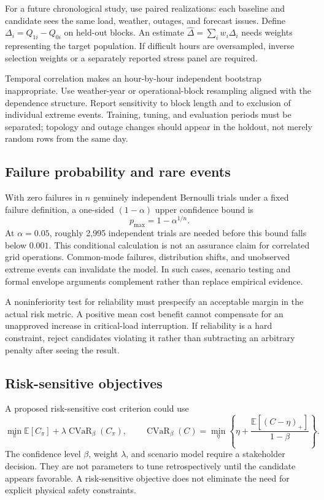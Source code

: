 \documentclass[11pt,letterpaper]{article}
\newcommand{\E}{\mathbb E}\newcommand{\R}{\mathbb R}\newcommand{\CRGC}{\operatorname{CRGC}}
\begin{document}
For a future chronological study, use paired realizations: each baseline and candidate sees the same load, weather, outages, and forecast issues. Define $\Delta_i=Q_{1i}-Q_{0i}$ on held-out blocks. An estimate $\hat\Delta=\sum_iw_i\Delta_i$ needs weights representing the target population. If difficult hours are oversampled, inverse selection weights or a separately reported stress panel are required.

Temporal correlation makes an hour-by-hour independent bootstrap inappropriate. Use weather-year or operational-block resampling aligned with the dependence structure. Report sensitivity to block length and to exclusion of individual extreme events. Training, tuning, and evaluation periods must be separated; topology and outage changes should appear in the holdout, not merely random rows from the same day.

\subsection{Failure probability and rare events}
With zero failures in $n$ genuinely independent Bernoulli trials under a fixed failure definition, a one-sided $(1-\alpha)$ upper confidence bound is
\[
 p_{\max}=1-\alpha^{1/n}.
\]
At $\alpha=0.05$, roughly 2,995 independent trials are needed before this bound falls below $0.001$. This conditional calculation is not an assurance claim for correlated grid operations. Common-mode failures, distribution shifts, and unobserved extreme events can invalidate the model. In such cases, scenario testing and formal envelope arguments complement rather than replace empirical evidence.

A noninferiority test for reliability must prespecify an acceptable margin in the actual risk metric. A positive mean cost benefit cannot compensate for an unapproved increase in critical-load interruption. If reliability is a hard constraint, reject candidates violating it rather than subtracting an arbitrary penalty after seeing the result.

\subsection{Risk-sensitive objectives}
A proposed risk-sensitive cost criterion could use
\[
 \min_\pi \E[C_\pi]+\lambda\operatorname{CVaR}_\beta(C_\pi),
 \qquad
 \operatorname{CVaR}_\beta(C)=
 \min_\eta\left\{\eta+\frac{\E[(C-\eta)_+]}{1-\beta}\right\}.
\]
The confidence level $\beta$, weight $\lambda$, and scenario model require a stakeholder decision. They are not parameters to tune retrospectively until the candidate appears favorable. A risk-sensitive objective does not eliminate the need for explicit physical safety constraints.
\end{document}
